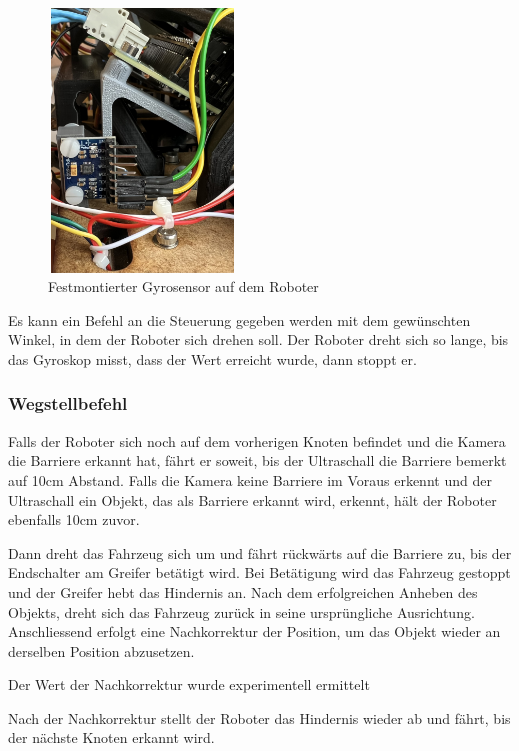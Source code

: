 \begin{figure}[H]
\centering
\includegraphics[width=5cm, height=7cm]{assets/ET/Gyroskop/Gyro_Montiert.jpeg}
\caption{Festmontierter Gyrosensor auf dem Roboter}
\label{fig:Gyroskop auf dem Roboter}
\end{figure}

Es kann ein Befehl an die Steuerung gegeben werden mit dem gewünschten Winkel, in dem der Roboter sich drehen soll. Der Roboter dreht sich so lange, bis das Gyroskop misst, dass der Wert erreicht wurde, dann stoppt er.

\subsubsection{Wegstellbefehl}

Falls der Roboter sich noch auf dem vorherigen Knoten befindet und die Kamera die Barriere erkannt hat, fährt er soweit, bis der Ultraschall die Barriere bemerkt auf 10cm Abstand. 
Falls die Kamera keine Barriere im Voraus erkennt und der Ultraschall ein Objekt, das als Barriere erkannt wird, erkennt, hält der Roboter ebenfalls 10cm zuvor.

Dann dreht das Fahrzeug sich um und fährt rückwärts auf die Barriere zu, bis der Endschalter am Greifer betätigt wird. Bei Betätigung wird das Fahrzeug gestoppt und der Greifer hebt das Hindernis an.
Nach dem erfolgreichen Anheben des Objekts, dreht sich das Fahrzeug zurück in seine ursprüngliche Ausrichtung. Anschliessend erfolgt eine Nachkorrektur der Position, um das Objekt wieder an derselben Position abzusetzen.

Der Wert der Nachkorrektur wurde experimentell ermittelt

Nach der Nachkorrektur stellt der Roboter das Hindernis wieder ab und fährt, bis der nächste Knoten erkannt wird.


\newpage
